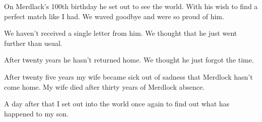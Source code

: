 \documentclass[letterpaper,10pt,twoside,twocolumn,openany]{book}
\begin{document}
		On Merdlack's 100th birthday he set out to see the world. With his wish to find a perfect match like I had. We waved goodbye and were so proud of him.
		
		We haven't received a single letter from him. We thought that he just went further than usual.
		
		After twenty years he hasn't returned home. We thought he just forgot the time. 
		
		After twenty five years my wife became sick out of sadness that Merdlock hasn't come home.
		My wife died after thirty years of Merdlock absence. 
		
		A day after that I set out into the world once again to find out what has happened to my son.  

	
	\vfill\null

	
	

		
		
		

	
\end{document}
